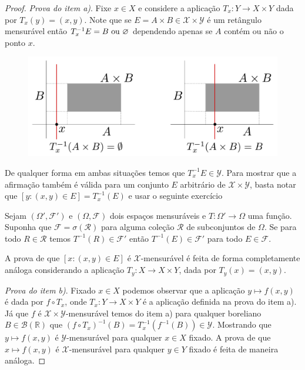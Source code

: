 \begin{proof}
\emph{Prova do item a)}. Fixe $x\in X$ e considere a aplicação  
$T_x:Y\to X\times Y$ dada por $T_x(y)=(x,y)$.
Note que se $E=A\times B\in \mathscr{X}\times \mathscr{Y}$
é um retângulo mensurável então $T_{x}^{-1}E=B~\textnormal{ou}~\varnothing$ 
dependendo apenas se 
$A$ contém ou não o ponto $x$.  

\begin{figure}
\centering
\vspace*{-0.7cm}
\includegraphics[scale=0.33]{Figuras/fig-medida-produto-aula10}
\caption{}
\label{medida-produto-1}
\end{figure}

De qualquer forma 
em ambas situações temos que $T_x^{-1}E\in \mathscr{Y}$.
Para mostrar que a afirmação também é válida para um conjunto 
$E$ arbitrário de $\mathscr{X}\times \mathscr{Y}$, 
basta notar que $[y: (x,y)\in E] = T^{-1}_{x}(E)$ e 
usar o seguinte exercício
\begin{exercicio}
	Sejam $(\Omega',\mathcal{F}')$ e $(\Omega,\mathcal{F})$
	dois espaços mensuráveis e $T:\Omega'\to\Omega$ uma função. 
	Suponha que $\mathcal{F}= \sigma(\mathscr{R})$
	para alguma coleção $\mathscr{R}$ de subconjuntos de $\Omega$.
	Se para todo $R\in \mathscr{R}$ temos $T^{-1}(R)\in \mathcal{F}'$
	então $T^{-1}(E)\in \mathcal{F}'$ para todo $E\in \mathcal{F}$.
\end{exercicio}
%
A prova de que $[x: (x,y)\in E]$ é $\mathscr{X}$-mensurável é feita de 
forma completamente análoga considerando a aplicação 
$T_y:X\to X\times Y$, dada por $T_y(x)=(x,y)$.

\bigskip
\noindent \emph{Prova do item b)}.  
Fixado $x\in X$ podemos observar que a aplicação $y\mapsto f(x,y)$
é dada por $f\circ T_{x}$, onde $T_x:Y\to X\times Y$ é a aplicação 
definida na prova do item a). Já que $f$ é $\mathscr{X}\times\mathscr{Y}$-mensurável
temos do item a) para qualquer boreliano $B\in \mathscr{B}(\mathbb{R})$ que 
$(f\circ T_x)^{-1}(B)= T^{-1}_x(f^{-1}(B)) \in \mathscr{Y}$.
Mostrando que $y\mapsto f(x,y)$ é $\mathscr{Y}$-mensurável para qualquer 
$x\in X$ fixado. A prova de que $x\mapsto f(x,y)$ é $\mathscr{X}$-mensurável 
para qualquer $y\in Y$ fixado é feita de maneira análoga.
\end{proof}


